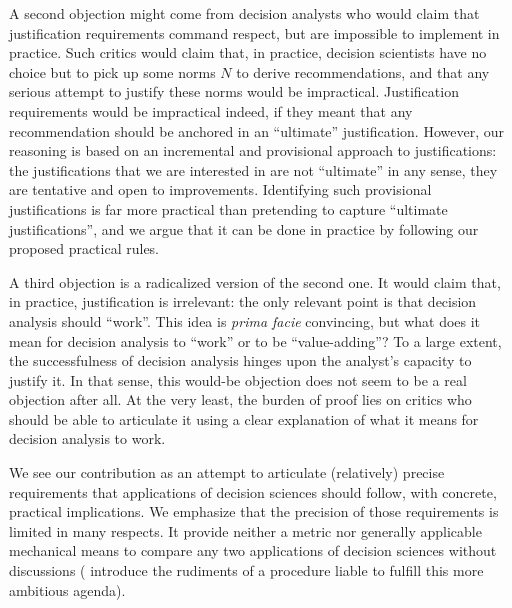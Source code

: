 \documentclass[preprint, french, english, 11pt, authoryear]{elsarticle}%
\begin{document}
A second objection might come from decision analysts who would claim that justification requirements command respect, but are impossible to implement in practice. Such critics would claim that, in practice, decision scientists have no choice but to pick up some norms $N$ to derive recommendations, and that any serious attempt to justify these norms would be impractical. Justification requirements would be impractical indeed, if they meant that any recommendation should be anchored in an “ultimate” justification. However, our reasoning is based on an incremental and provisional approach to justifications: the justifications that we are interested in are not ``ultimate'' in any sense, they are tentative and open to improvements. Identifying such provisional justifications is far more practical than pretending to capture ``ultimate justifications'', and we argue that it can be done in practice by following our proposed practical rules.

A third objection is a radicalized version of the second one. It would claim that, in practice, justification is irrelevant: the only relevant point is that decision analysis should ``work''. This idea is \emph{prima facie} convincing, but what does it mean for decision analysis to ``work'' or to be ``value-adding''? 
To a large extent, the successfulness of decision analysis hinges upon the analyst's capacity to justify it. In that sense, this would-be objection does not seem to be a real objection after all. At the very least, the burden of proof lies on critics who should be able to articulate it using a clear explanation of what it means for decision analysis to work. 

We see our contribution as an attempt to articulate (relatively) precise requirements that applications of decision sciences should follow, with concrete, practical implications. We emphasize that the precision of those requirements is limited in many respects.
It provide neither a metric nor generally applicable mechanical means to compare any two applications of decision sciences without discussions (\citet{cailloux_formal_2018} introduce the rudiments of a procedure liable to fulfill this more ambitious agenda).
\end{document}
